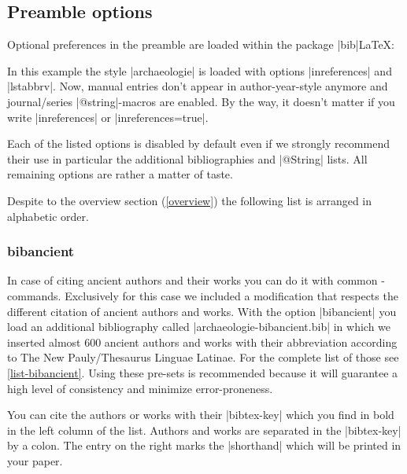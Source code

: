 \documentclass[a4paper,
10pt,
greek,
french,
spanish,
italian,
ngerman,
english
]{ltxdoc}
\begin{document}
\subsection{Preamble options}\label{options-preamble}
Optional preferences in the preamble are loaded within the package |bib|\LaTeX:
\begin{code}
\usepackage[%
    backend=biber,  %
    style=archaeologie,   %
    inreferences=true,    %
    lstabbrv              %
    ]{biblatex}
\end{code}
In this example the style |archaeologie| is loaded with options |inreferences| and |lstabbrv|. 
Now, manual entries don't appear in author-year-style anymore and journal/series |@string|-macros are enabled.
By the way, it doesn't matter if you write |inreferences| or |inreferences=true|.

Each of the listed options is disabled by default even if we strongly recommend their use in particular the additional bibliographies and |@String| lists. 
All remaining options are rather a matter of taste.

Despite to the overview section (\cref{overview}) the following list is arranged in alphabetic order.

\subsubsection{bibancient}\label{bibancient}
In case of citing ancient authors and their works you can do it with common -commands.
Exclusively for this case we included a modification that respects the different citation of ancient authors and works.
With the option |bibancient| you load an additional bibliography called |archaeologie-bibancient.bib| in which we inserted almost 600 ancient authors and works with their abbreviation according to The New Pauly/Thesaurus Linguae Latinae.
For the complete list of those see \cref{list-bibancient}.
Using these pre-sets is recommended because it will guarantee a high level of consistency and minimize error-proneness.

You can cite the authors or works with their |bibtex-key| which you find in bold in the left column of the list. 
Authors and works are separated in the |bibtex-key| by a colon.
The entry on the right marks the |shorthand| which will be printed in your paper.
\end{document}
